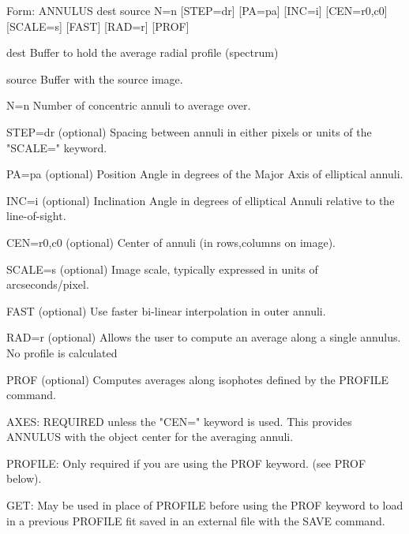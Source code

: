 {\newpage\clearpage
{}%
\begin{command}
  \item[Form: ANNULUS dest source N=n {[STEP=dr]} {[PA=pa]} {[INC=i]} 
       {[CEN=r0,c0]} {[SCALE=s]} {[FAST]} {[RAD=r]} {[PROF]}\hfill]{}
  \item[dest]{Buffer to hold the average radial profile (spectrum)}
  \item[source]{Buffer with the source image.}
  \item[N=n]{Number of concentric annuli to average over.}
  \item[STEP=dr]{(optional) Spacing between annuli in either pixels or
       units of the "SCALE=" keyword.}
  \item[PA=pa]{(optional) Position Angle in degrees of the Major Axis 
       of elliptical annuli.}
  \item[INC=i]{(optional) Inclination Angle in degrees of elliptical 
       Annuli relative to the line-of-sight.}
  \item[CEN=r0,c0]{(optional) Center of annuli (in rows,columns on image).}
  \item[SCALE=s]{(optional) Image scale, typically expressed in units
       of arcseconds/pixel.}
  \item[FAST]{(optional) Use faster bi-linear interpolation in outer annuli.}
  \item[RAD=r]{(optional) Allows the user to compute an average along
       a single annulus.  No profile is calculated}
  \item[PROF]{(optional) Computes averages along isophotes defined by
       the PROFILE command.}
\end{command}%
\lthtmlfigureZ
\lthtmlcheckvsize\clearpage}

{\newpage\clearpage
{}%
\begin{hanging}
  \item{AXES: REQUIRED unless the "CEN=" keyword is used.  This provides
        ANNULUS with the object center for the averaging annuli. }
\par
\item{PROFILE: Only required if you are using the PROF keyword. (see PROF
        below).}
\par
\item{GET: May be used in place of PROFILE before using the PROF keyword
        to load in a previous PROFILE fit saved in an external file with
        the SAVE command. }
\end{hanging}%
\lthtmlfigureZ
\lthtmlcheckvsize\clearpage}

